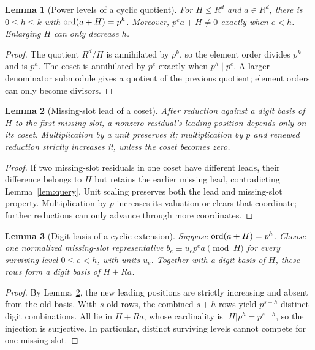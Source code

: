 \documentclass[11pt,a4paper]{article}
\theoremstyle{definition}
\theoremstyle{plain}
\newtheorem{lemma}{Lemma}
\begin{document}
\begin{lemma}[Power levels of a cyclic quotient]\label{lem:order}
For $H\le R^d$ and $a\in R^d$, there is $0\le h\le k$ with $\operatorname{ord}(a+H)=p^h$.
Moreover, $p^e a+H\ne0$ exactly when $e<h$. Enlarging $H$ can only decrease $h$.
\end{lemma}
\begin{proof}
The quotient $R^d/H$ is annihilated by $p^k$, so the element order divides $p^k$ and is $p^h$.
The coset is annihilated by $p^e$ exactly when $p^h\mid p^e$. A larger denominator submodule
gives a quotient of the previous quotient; element orders can only become divisors.
\end{proof}

\begin{lemma}[Missing-slot lead of a coset]\label{lem:coset}
After reduction against a digit basis of $H$ to the first missing slot, a nonzero residual's
leading position depends only on its coset. Multiplication by a unit preserves it; multiplication
by $p$ and renewed reduction strictly increases it, unless the coset becomes zero.
\end{lemma}
\begin{proof}
If two missing-slot residuals in one coset have different leads, their difference belongs to $H$
but retains the earlier missing lead, contradicting Lemma~\ref{lem:query}. Unit scaling preserves
both the lead and missing-slot property. Multiplication by $p$ increases its valuation or clears
that coordinate; further reductions can only advance through more coordinates.
\end{proof}

\begin{lemma}[Digit basis of a cyclic extension]\label{lem:extension}
Suppose $\operatorname{ord}(a+H)=p^h$. Choose one normalized missing-slot representative
$b_e\equiv u_e p^e a\pmod H$ for every surviving level $0\le e<h$, with units $u_e$.
Together with a digit basis of $H$, these rows form a digit basis of $H+Ra$.
\end{lemma}
\begin{proof}
By Lemma~\ref{lem:coset}, the new leading positions are strictly increasing and absent from the old
basis. With $s$ old rows, the combined $s+h$ rows yield $p^{s+h}$ distinct digit combinations.
All lie in $H+Ra$, whose cardinality is $|H|p^h=p^{s+h}$, so the injection is surjective.
In particular, distinct surviving levels cannot compete for one missing slot.
\end{proof}
\end{document}
